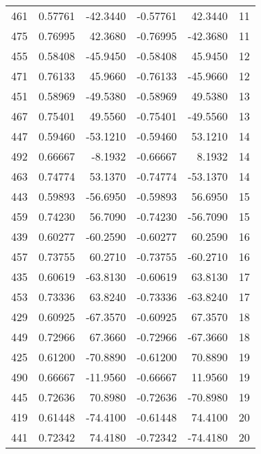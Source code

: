 \begin{tabular}{rrrrrr}
 461 &  0.57761 & -42.3440 &    -0.57761 &     42.3440 &  11 \\
 475 &  0.76995 &  42.3680 &    -0.76995 &    -42.3680 &  11 \\
 455 &  0.58408 & -45.9450 &    -0.58408 &     45.9450 &  12 \\
 471 &  0.76133 &  45.9660 &    -0.76133 &    -45.9660 &  12 \\
 451 &  0.58969 & -49.5380 &    -0.58969 &     49.5380 &  13 \\
 467 &  0.75401 &  49.5560 &    -0.75401 &    -49.5560 &  13 \\
 447 &  0.59460 & -53.1210 &    -0.59460 &     53.1210 &  14 \\
 492 &  0.66667 &  -8.1932 &    -0.66667 &      8.1932 &  14 \\
 463 &  0.74774 &  53.1370 &    -0.74774 &    -53.1370 &  14 \\
 443 &  0.59893 & -56.6950 &    -0.59893 &     56.6950 &  15 \\
 459 &  0.74230 &  56.7090 &    -0.74230 &    -56.7090 &  15 \\
 439 &  0.60277 & -60.2590 &    -0.60277 &     60.2590 &  16 \\
 457 &  0.73755 &  60.2710 &    -0.73755 &    -60.2710 &  16 \\
 435 &  0.60619 & -63.8130 &    -0.60619 &     63.8130 &  17 \\
 453 &  0.73336 &  63.8240 &    -0.73336 &    -63.8240 &  17 \\
 429 &  0.60925 & -67.3570 &    -0.60925 &     67.3570 &  18 \\
 449 &  0.72966 &  67.3660 &    -0.72966 &    -67.3660 &  18 \\
 425 &  0.61200 & -70.8890 &    -0.61200 &     70.8890 &  19 \\
 490 &  0.66667 & -11.9560 &    -0.66667 &     11.9560 &  19 \\
 445 &  0.72636 &  70.8980 &    -0.72636 &    -70.8980 &  19 \\
 419 &  0.61448 & -74.4100 &    -0.61448 &     74.4100 &  20 \\
 441 &  0.72342 &  74.4180 &    -0.72342 &    -74.4180 &  20 \\
\bottomrule
\end{tabular}
